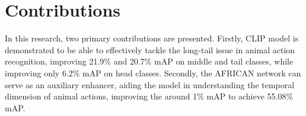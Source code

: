 \section{Contributions}
In this research, two primary contributions are presented. Firstly, CLIP model is demonstrated to be able to effectively tackle the long-tail issue in animal action recognition, improving 21.9\% and 20.7\% mAP on middle and tail classes, while improving only 6.2\% mAP on head classes. Secondly, the AFRICAN network can serve as an auxiliary enhancer, aiding the model in understanding the temporal dimension of animal actions, improving the around 1\% mAP to achieve 55.08\% mAP.

